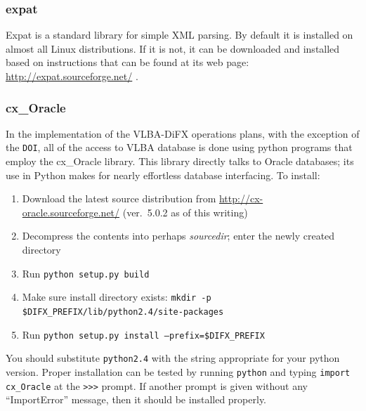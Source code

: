 
\subsubsection{expat} \label{sec:expat}

Expat is a standard library for simple XML parsing.
By default it is installed on almost all Linux distributions.
If it is not, it can be downloaded and installed based on instructions that can be found at its web page:
\url{http://expat.sourceforge.net/} .









\subsubsection{cx\_Oracle} \label{sec:cxOracle}

In the implementation of the VLBA-DiFX operations plans, with the exception of the {\tt DOI}, all of the access to VLBA database is done using python programs that employ the cx\_Oracle library.
This library directly talks to Oracle databases; its use in Python makes for nearly effortless database interfacing.
To install:
\begin{enumerate}
\item Download the latest source distribution from \url{http://cx-oracle.sourceforge.net/} (ver.\ 5.0.2 as of this writing)
\item Decompress the contents into perhaps {\em sourcedir}; enter the newly created directory
\item Run {\tt python setup.py build}
\item Make sure install directory exists:  {\tt mkdir -p \$DIFX\_PREFIX/lib/python2.4/site-packages}
\item Run {\tt python setup.py install --prefix=\$DIFX\_PREFIX}
\end{enumerate}

\noindent
You should substitute {\tt python2.4} with the string appropriate for your python version.
Proper installation can be tested by running {\tt python} and typing {\tt import cx\_Oracle} at the {\tt >>>} prompt.
If another prompt is given without any ``ImportError'' message, then it should be installed properly.








